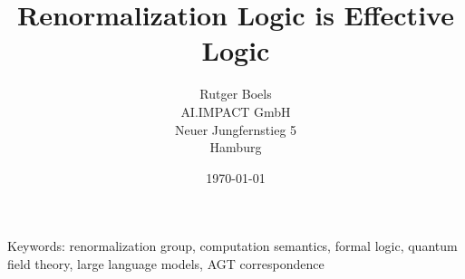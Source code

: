 \documentclass[11pt,a4paper]{article}
\title{Renormalization Logic is Effective Logic}
\author{Rutger Boels\\AI.IMPACT GmbH\\Neuer Jungfernstieg 5\\Hamburg}
\date{\today}
\theoremstyle{definition}
\begin{document}
\maketitle



Keywords: renormalization group, computation semantics, formal logic, quantum field theory, large language models, AGT correspondence

\tableofcontents
\newpage


























\end{document}
